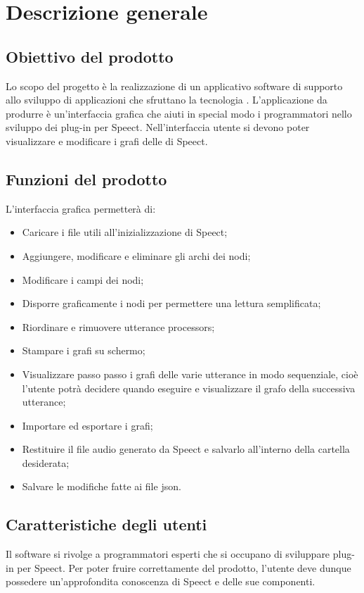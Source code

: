 \documentclass[../AnalisideiRequisiti.tex]{subfiles}
\begin{document}
	
\chapter{Descrizione generale}

\section{Obiettivo del prodotto}

Lo scopo del progetto è la realizzazione di un applicativo software di supporto allo sviluppo di applicazioni che sfruttano la tecnologia . L’applicazione da produrre è un'interfaccia grafica che aiuti in special modo i programmatori nello sviluppo dei plug-in per Speect. Nell’interfaccia utente si devono poter visualizzare e modificare i grafi delle  di Speect. 


\section{Funzioni del prodotto}
L’interfaccia grafica permetterà di:
\begin{itemize}
	\item{} Caricare i file  utili all’inizializzazione di Speect;
	\item{} Aggiungere, modificare e eliminare gli archi dei nodi;
	\item{} Modificare i campi dei nodi;
	\item{} Disporre graficamente i nodi per permettere una lettura semplificata;
	\item{} Riordinare e rimuovere utterance processors;
	\item{} Stampare i grafi su schermo;
	\item{} Visualizzare passo passo i grafi delle varie utterance in modo sequenziale, cioè l’utente potrà decidere quando eseguire e visualizzare il grafo della successiva utterance;
	\item{} Importare ed esportare i grafi;	
	\item{} Restituire il file audio generato da Speect e salvarlo all'interno della cartella desiderata;
	\item{} Salvare le modifiche fatte ai file json.
\end{itemize}


\section{Caratteristiche degli utenti}
Il software si rivolge a programmatori esperti che si occupano di sviluppare plug-in per Speect. Per poter fruire correttamente del prodotto, l'utente deve dunque possedere un'approfondita conoscenza di Speect e delle sue componenti.
\end{document}
